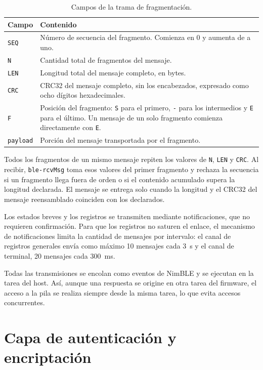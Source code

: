 \begin{table}[htbp]
\centering
\caption{Campos de la trama de fragmentación.}
\label{tab:trama_fragmento}
\begin{tabular}{L{0.14\textwidth} L{0.74\textwidth}}
\toprule
\textbf{Campo} & \textbf{Contenido} \\
\midrule
\texttt{SEQ} & Número de secuencia del fragmento. Comienza en 0 y aumenta de a uno. \\
\texttt{N} & Cantidad total de fragmentos del mensaje. \\
\texttt{LEN} & Longitud total del mensaje completo, en bytes. \\
\texttt{CRC} & CRC32 del mensaje completo, sin los encabezados, expresado como ocho dígitos hexadecimales. \\
\texttt{F} & Posición del fragmento: \texttt{S} para el primero, \texttt{-} para los intermedios y \texttt{E} para el último. Un mensaje de un solo fragmento comienza directamente con \texttt{E}. \\
\texttt{payload} & Porción del mensaje transportada por el fragmento. \\
\bottomrule
\end{tabular}
\end{table}

Todos los fragmentos de un mismo mensaje repiten los valores de \texttt{N}, \texttt{LEN} y \texttt{CRC}. Al recibir, \texttt{ble-rcvMsg} toma esos valores del primer fragmento y rechaza la secuencia si un fragmento llega fuera de orden o si el contenido acumulado supera la longitud declarada. El mensaje se entrega solo cuando la longitud y el CRC32 del mensaje reensamblado coinciden con los declarados.

Los estados breves y los registros se transmiten mediante notificaciones, que no requieren confirmación. Para que los registros no saturen el enlace, el mecanismo de notificaciones limita la cantidad de mensajes por intervalo: el canal de registros generales envía como máximo 10 mensajes cada 3~s y el canal de terminal, 20 mensajes cada 300~ms.

Todas las transmisiones se encolan como eventos de NimBLE y se ejecutan en la tarea del host. Así, aunque una respuesta se origine en otra tarea del firmware, el acceso a la pila se realiza siempre desde la misma tarea, lo que evita accesos concurrentes.


\section{Capa de autenticación y encriptación}
\label{sec:autenticacion}

